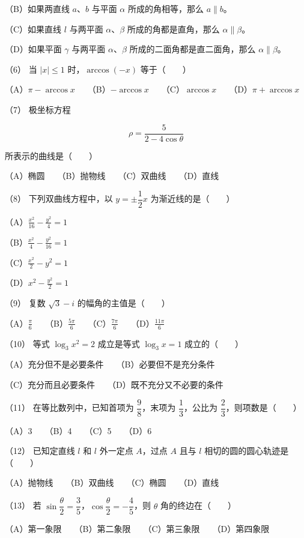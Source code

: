 \begin{answer}
（B）如果两直线 $a\text{、}b$ 与平面 $\alpha$ 所成的角相等，那么 $a\parallel b$。

（C）如果直线 $l$ 与两平面 $\alpha\text{、}\beta$ 所成的角都是直角，那么 $\alpha\parallel\beta$。

（D）如果平面 $\gamma$ 与两平面 $\alpha\text{、}\beta$ 所成的二面角都是直二面角，那么 $\alpha\parallel\beta$。

（6） 当 $|x|\le1$ 时，$\arccos(-x)$ 等于\mbox{（　　）}

（A）$\pi-\arccos x$　　（B）$-\arccos x$　　（C）$\arccos x$　　（D）$\pi+\arccos x$

（7） 极坐标方程

\nopagebreak[4]
\[
\rho=\frac5{2-4\cos\theta}
\]

所表示的曲线是\mbox{（　　）}

（A）椭圆　　（B）抛物线　　（C）双曲线　　（D）直线

（8） 下列双曲线方程中，以 $y=\pm\dfrac12x$ 为渐近线的是\mbox{（　　）}

（A）$\frac{x^2}{16}-\frac{y^2}{4}=1$

（B）$\frac{x^2}{4}-\frac{y^2}{16}=1$

（C）$\frac{x^2}{2}-y^2=1$

（D）$x^2-\frac{y^2}{2}=1$

（9） 复数 $\sqrt3-i$ 的幅角的主值是\mbox{（　　）}

（A）$\frac\pi6$　　（B）$\frac{5\pi}6$　　（C）$\frac{7\pi}6$　　（D）$\frac{11\pi}6$

（10） 等式 $\log_3x^2=2$ 成立是等式 $\log_3x=1$ 成立的\mbox{（　　）}

（A）充分但不是必要条件　　（B）必要但不是充分条件

（C）充分而且必要条件　　（D）既不充分又不必要的条件

（11） 在等比数列中，已知首项为 $\dfrac98$，末项为 $\dfrac13$，公比为 $\dfrac23$，则项数是\mbox{（　　）}

（A）3　　（B）4　　（C）5　　（D）6

（12） 已知定直线 $l$ 和 $l$ 外一定点 $A$，过点 $A$ 且与 $l$ 相切的圆的圆心轨迹是\mbox{（　　）}

（A）抛物线　　（B）双曲线　　（C）椭圆　　（D）直线

（13） 若 $\sin\dfrac\theta2=\dfrac35$，$\cos\dfrac\theta2=-\dfrac45$，则 $\theta$ 角的终边在\mbox{（　　）}

（A）第一象限　　（B）第二象限　　（C）第三象限　　（D）第四象限


\end{answer}
